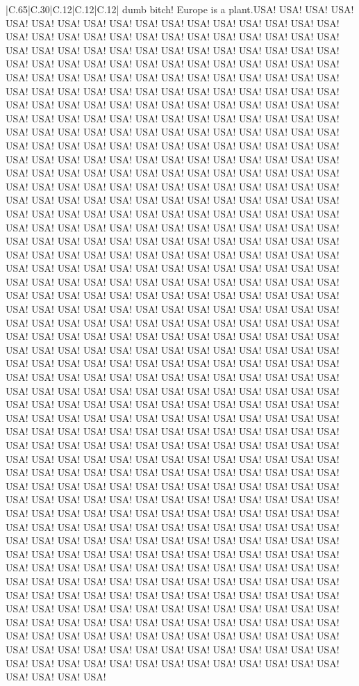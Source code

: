 \documentclass[11pt]{article}
\newlength\mylength
\begin{document}
\begin{center}
\begin{longtable}{|C{.65\mylength}|C{.30\mylength}|C{.12\mylength}|C{.12\mylength}|C{.12\mylength}|}
  \small dumb bitch! Europe is a plant.USA! USA! USA! USA! USA! USA! USA! USA! USA! USA! USA! USA! USA! USA! USA! USA! USA! USA! USA! USA! USA! USA! USA! USA! USA! USA! USA! USA! USA! USA! USA! USA! USA! USA! USA! USA! USA! USA! USA! USA! USA! USA! USA! USA! USA! USA! USA! USA! USA! USA! USA! USA! USA! USA! USA! USA! USA! USA! USA! USA! USA! USA! USA! USA! USA! USA! USA! USA! USA! USA! USA! USA! USA! USA! USA! USA! USA! USA! USA! USA! USA! USA! USA! USA! USA! USA! USA! USA! USA! USA! USA! USA! USA! USA! USA! USA! USA! USA! USA! USA! USA! USA! USA! USA! USA! USA! USA! USA! USA! USA! USA! USA! USA! USA! USA! USA! USA! USA! USA! USA! USA! USA! USA! USA! USA! USA! USA! USA! USA! USA! USA! USA! USA! USA! USA! USA! USA! USA! USA! USA! USA! USA! USA! USA! USA! USA! USA! USA! USA! USA! USA! USA! USA! USA! USA! USA! USA! USA! USA! USA! USA! USA! USA! USA! USA! USA! USA! USA! USA! USA! USA! USA! USA! USA! USA! USA! USA! USA! USA! USA! USA! USA! USA! USA! USA! USA! USA! USA! USA! USA! USA! USA! USA! USA! USA! USA! USA! USA! USA! USA! USA! USA! USA! USA! USA! USA! USA! USA! USA! USA! USA! USA! USA! USA! USA! USA! USA! USA! USA! USA! USA! USA! USA! USA! USA! USA! USA! USA! USA! USA! USA! USA! USA! USA! USA! USA! USA! USA! USA! USA! USA! USA! USA! USA! USA! USA! USA! USA! USA! USA! USA! USA! USA! USA! USA! USA! USA! USA! USA! USA! USA! USA! USA! USA! USA! USA! USA! USA! USA! USA! USA! USA! USA! USA! USA! USA! USA! USA! USA! USA! USA! USA! USA! USA! USA! USA! USA! USA! USA! USA! USA! USA! USA! USA! USA! USA! USA! USA! USA! USA! USA! USA! USA! USA! USA! USA! USA! USA! USA! USA! USA! USA! USA! USA! USA! USA! USA! USA! USA! USA! USA! USA! USA! USA! USA! USA! USA! USA! USA! USA! USA! USA! USA! USA! USA! USA! USA! USA! USA! USA! USA! USA! USA! USA! USA! USA! USA! USA! USA! USA! USA! USA! USA! USA! USA! USA! USA! USA! USA! USA! USA! USA! USA! USA! USA! USA! USA! USA! USA! USA! USA! USA! USA! USA! USA! USA! USA! USA! USA! USA! USA! USA! USA! USA! USA! USA! USA! USA! USA! USA! USA! USA! USA! USA! USA! USA! USA! USA! USA! USA! USA! USA! USA! USA! USA! USA! USA! USA! USA! USA! USA! USA! USA! USA! USA! USA! USA! USA! USA! USA! USA! USA! USA! USA! USA! USA! USA! USA! USA! USA! USA! USA! USA! USA! USA! USA! USA! USA! USA! USA! USA! USA! USA! USA! USA! USA! USA! USA! USA! USA! USA! USA! USA! USA! USA! USA! USA! USA! USA! USA! USA! USA! USA! USA! USA! USA! USA! USA! USA! USA! USA! USA! USA! USA! USA! USA! USA! USA! USA! USA! USA! USA! USA! USA! USA! USA! USA! USA! USA! USA! USA! USA! USA! USA! USA! USA! USA! USA! USA! USA! USA! USA! USA! USA! USA! USA! USA! USA! USA! USA! USA! USA! USA! USA! USA! USA! USA! USA! USA! USA! USA! USA! USA! USA! USA! USA! USA! USA! USA! USA! USA! USA! USA! USA! USA! USA! USA! USA! USA! USA! USA! USA! USA! USA! USA! USA! USA! USA! USA! USA! USA! USA! USA! USA! USA! USA! USA! USA! USA! USA! USA! USA! USA! USA! USA! USA! USA! USA! USA! USA! USA! USA! USA! USA! USA! USA! USA! USA! USA! USA! USA! USA! USA! USA! USA! USA! USA! USA! USA! USA! USA! USA! USA! USA! USA! USA! USA! USA! USA! USA! USA! USA! USA! USA! USA! USA! USA! USA! USA! USA! USA! USA! USA! USA! USA! USA! USA! USA! USA! USA! USA! USA! USA! USA! USA! USA! USA! USA! USA! USA! USA! USA! 
\end{longtable}
\end{center}
\end{document}
